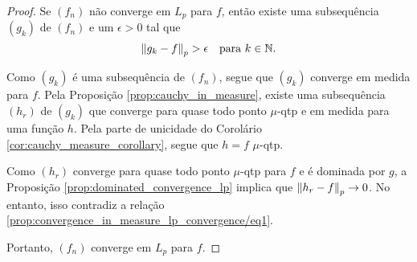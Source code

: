 \begin{proof}
    Se $(f_n)$ não converge em $L_p$ para $f$, então existe uma subsequência $(g_k)$ de $(f_n)$ e um $\epsilon > 0$ tal que
    \begin{equation}\label{prop:convergence_in_measure_lp_convergence/eq1}
        \left\lVert g_k - f \right\rVert_p > \epsilon \quad \text{para } k \in \mathbb{N}.
    \end{equation}

    Como $(g_k)$ é uma subsequência de $(f_n)$, segue que $(g_k)$ converge em medida para $f$. Pela Proposição \ref{prop:cauchy_in_measure}, existe uma subsequência $(h_r)$ de $(g_k)$ que converge para quase todo ponto \(\mu\)-qtp e em medida para uma função $h$. Pela parte de unicidade do Corolário \ref{cor:cauchy_measure_corollary}, segue que $h = f$ \(\mu\)-qtp.

    Como $(h_r)$ converge para quase todo ponto \(\mu\)-qtp para $f$ e é dominada por $g$, a Proposição \ref{prop:dominated_convergence_lp} implica que $\left\lVert h_r - f \right\rVert_p \to 0$. No entanto, isso contradiz a relação \eqref{prop:convergence_in_measure_lp_convergence/eq1}.

    Portanto, $(f_n)$ converge em $L_p$ para $f$.
\end{proof}
